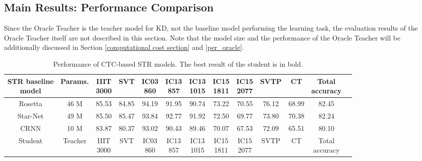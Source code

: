 \documentclass[journal]{IEEEtran}
\begin{document}
\subsection{Main Results: Performance Comparison}
Since the Oracle Teacher is the teacher model for KD, not the baseline model performing the learning task, the evaluation results of the Oracle Teacher itself are not described in this section. Note that the model size and the performance of the Oracle Teacher will be additionally discussed in Section \ref{computational cost section} and \ref{per_oracle}.
\begin{table}[t]
\centering
\caption{Performance of CTC-based STR models. The best result of the student is in bold.}{%
{\fontsize{7.3}{8.76}\selectfont
\centering
\begin{tabular}{|c|c|c|c|c|c|c|c|c|c|c|c|c|}
\hline
\makecell{STR baseline\\model} & Params. & \makecell{IIIT\\3000}     & SVT             & \makecell{IC03\\860}         & \makecell{IC13\\857}        &\makecell{IC13\\1015}       & \makecell{IC15\\1811}       & \makecell{IC15\\2077}       & SVTP            & CT          & \makecell{Total\\accuracy}  \\
\hline
Rosetta \cite{rosetta:scheme} & 46 M & 85.53 & 84.85 &94.19  &91.95 &90.74 &73.22 &70.55 &76.12 &68.99 &82.45 \\
Star-Net \cite{starnet:scheme} & 49 M & 85.50 & 85.47 & 93.84  &92.77 & 91.92 &72.50 &69.77 &73.80 &70.38 &82.24\\
CRNN \cite{crnn:scheme}  & 10 M  & 83.87          & 80.37          & 93.02            & 90.43          & 89.46          & 70.07          & 67.53          & 72.09          & 65.51          & 80.10          \\
 \hline
 \hline
  Student&Teacher                   & \makecell{IIIT\\3000}     & SVT             & \makecell{IC03\\860}            & \makecell{IC13\\857}        &\makecell{IC13\\1015}       & \makecell{IC15\\1811}       & \makecell{IC15\\2077}       & SVTP            & CT          & \makecell{Total\\accuracy}  \\

\end{tabular}}}
\end{table}
\end{document}
